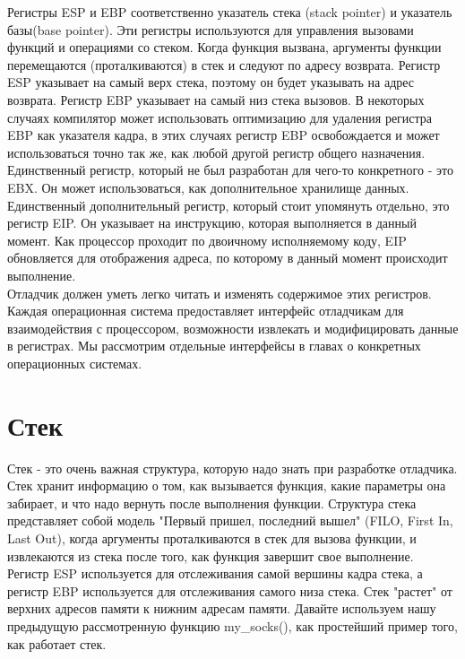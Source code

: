 \documentclass[12pt, a4paper, oneside]{book}
\begin{document}
Регистры ESP и EBP соответственно указатель стека (stack pointer) и указатель базы(base pointer). Эти регистры используются для управления вызовами функций и операциями со стеком. Когда функция вызвана, аргументы функции перемещаются (проталкиваются) в стек и следуют по адресу возврата. Регистр ESP указывает на самый верх стека, поэтому он будет указывать на адрес возврата. Регистр EBP указывает на самый низ стека вызовов. В некоторых случаях компилятор может использовать оптимизацию для удаления регистра EBP как указателя кадра, в этих случаях регистр EBP освобождается и может использоваться точно так же, как любой другой регистр общего назначения.\\

Единственный регистр, который не был разработан для чего-то конкретного - это EBX. Он может использоваться, как дополнительное хранилище данных.\\

Единственный дополнительный регистр, который стоит упомянуть отдельно, это регистр EIP. Он указывает на инструкцию, которая выполняется в данный момент. Как процессор проходит по двоичному исполняемому коду, EIP обновляется для отображения адреса, по которому в данный момент происходит выполнение.\\

Отладчик должен уметь легко читать и изменять содержимое этих регистров. Каждая операционная система предоставляет интерфейс отладчикам для взаимодействия с процессором, возможности извлекать и модифицировать данные в регистрах. Мы рассмотрим отдельные интерфейсы в главах о конкретных операционных системах.\\

\section{Стек}

Стек - это очень важная структура, которую надо знать при разработке отладчика. Стек хранит информацию о том, как вызывается функция, какие параметры она забирает, и что надо вернуть после выполнения функции. Структура стека представляет собой модель "Первый пришел, последний вышел" (FILO, First In, Last Out), когда аргументы проталкиваются в стек для вызова функции, и извлекаются из стека после того, как функция завершит свое выполнение. Регистр ESP используется для отслеживания самой вершины кадра стека, а регистр EBP используется для отслеживания самого низа стека. Стек "растет" от верхних адресов памяти к нижним адресам памяти. Давайте используем нашу предыдущую рассмотренную функцию my\_socks(), как простейший пример того, как работает стек.\\
\end{document}
